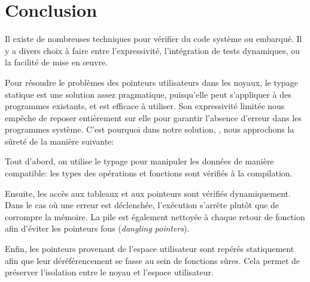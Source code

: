 
\section*{Conclusion}

Il existe de nombreuses techniques pour vérifier du code système ou embarqué. Il
y a divers choix à faire entre l'expressivité, l'intégration de tests
dynamiques, ou la facilité de mise en œuvre.

Pour résoudre le problèmes des pointeurs utilisateurs dans les noyaux, le typage
statique est une solution assez pragmatique, puisqu'elle peut s'appliquer à des
programmes existants, et est efficace à utiliser. Son expressivité limitée nous
empêche de reposer entièrement sur elle pour garantir l'absence d'erreur dans
les programmes système. C'est pourquoi dans notre solution, \langname, nous
approchons la sûreté de la manière suivante:

Tout d'abord, on utilise le typage pour manipuler les données de manière
compatible: les types des opérations et fonctions sont vérifiés à la
compilation.

Ensuite, les accès aux tableaux et aux pointeurs sont vérifiés dynamiquement.
Dans le cas où une erreur est déclenchée, l'exécution s'arrête plutôt que de
corrompre la mémoire. La pile est également nettoyée à chaque retour de fonction
afin d'éviter les pointeurs fous (\emph{dangling pointers}).

Enfin, les pointeurs provenant de l'espace utilisateur sont repérés statiquement
afin que leur déréférencement se fasse au sein de fonctions sûres. Cela permet
de préserver l'isolation entre le noyau et l'espace utilisateur.

